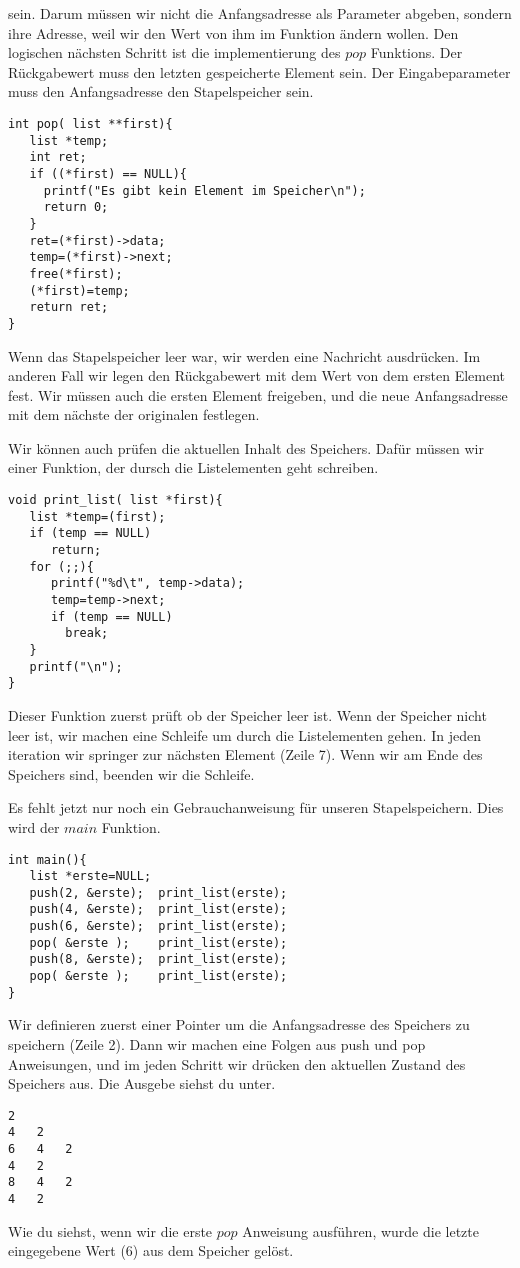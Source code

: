 \documentclass{article}[12pt]
\begin{document}
sein. Darum müssen wir nicht die Anfangsadresse als Parameter abgeben, sondern ihre Adresse,
weil wir den Wert von ihm im Funktion ändern wollen. Den logischen nächsten Schritt
ist die implementierung des $pop$ Funktions. Der Rückgabewert muss den letzten gespeicherte
Element sein. Der Eingabeparameter muss den Anfangsadresse den Stapelspeicher sein.
\begin{lstlisting}
int pop( list **first){
   list *temp;
   int ret;
   if ((*first) == NULL){
     printf("Es gibt kein Element im Speicher\n");
     return 0;
   }
   ret=(*first)->data;
   temp=(*first)->next;
   free(*first);
   (*first)=temp;
   return ret;
}
\end{lstlisting}
Wenn das Stapelspeicher leer war, wir werden eine Nachricht ausdrücken. 
Im anderen Fall wir legen den Rückgabewert mit dem Wert von dem ersten 
Element fest. Wir müssen auch die ersten Element freigeben, und die neue
Anfangsadresse mit dem nächste der originalen festlegen.

Wir können auch prüfen die aktuellen Inhalt des Speichers. 
Dafür müssen wir einer Funktion, der dursch die Listelementen geht
schreiben.
\begin{lstlisting}
void print_list( list *first){
   list *temp=(first);
   if (temp == NULL)
      return;
   for (;;){
      printf("%d\t", temp->data);
      temp=temp->next;
      if (temp == NULL)
        break;
   }
   printf("\n");
}
\end{lstlisting}
Dieser Funktion zuerst prüft ob der Speicher leer ist. Wenn der
Speicher nicht leer ist, wir machen eine Schleife um durch die
Listelementen gehen. In jeden iteration wir springer zur 
nächsten Element (Zeile 7). Wenn wir am Ende des Speichers
sind, beenden wir die Schleife.

Es fehlt jetzt nur noch ein Gebrauchanweisung für unseren Stapelspeichern.
Dies wird der $main$ Funktion.
\begin{lstlisting}
int main(){
   list *erste=NULL;
   push(2, &erste);  print_list(erste);
   push(4, &erste);  print_list(erste);
   push(6, &erste);  print_list(erste);
   pop( &erste );    print_list(erste);
   push(8, &erste);  print_list(erste);
   pop( &erste );    print_list(erste);
}
\end{lstlisting}
Wir definieren zuerst einer Pointer um die 
Anfangsadresse des Speichers zu speichern (Zeile 2). Dann wir machen eine
Folgen aus push und pop Anweisungen, und im jeden Schritt wir drücken
den aktuellen Zustand des Speichers aus. Die Ausgebe siehst du unter.
\begin{lstlisting}
2	
4	2	
6	4	2	
4	2	
8	4	2	
4	2	
\end{lstlisting}
Wie du siehst, wenn wir die erste $pop$ Anweisung ausführen, wurde die letzte 
eingegebene Wert (6) aus dem Speicher gelöst. 
\end{document}
